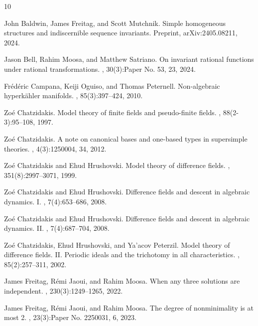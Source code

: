 \documentclass[\DocOpts]{amsart}
\theoremstyle{definition}
\newcommand{\<}{\langle}
\renewcommand{\>}{\rangle}
\begin{document}
\vfill\pagebreak

\begin{thebibliography}{10}

John Baldwin, James Freitag, and Scott Mutchnik.
\newblock Simple homogeneous structures and indiscernible sequence invariants.
\newblock Preprint, arXiv:2405.08211, 2024.

Jason Bell, Rahim Moosa, and Matthew Satriano.
\newblock On invariant rational functions under rational transformations.
, 30(3):Paper No. 53, 23, 2024.

Fr\'{e}d\'{e}ric Campana, Keiji Oguiso, and Thomas Peternell.
\newblock Non-algebraic hyperk\"{a}hler manifolds.
, 85(3):397--424, 2010.

Zo\'{e} Chatzidakis.
\newblock Model theory of finite fields and pseudo-finite fields.
, 88(2-3):95--108, 1997.

Zo\'{e} Chatzidakis.
\newblock A note on canonical bases and one-based types in supersimple
  theories.
, 4(3):1250004, 34, 2012.

Zo\'{e} Chatzidakis and Ehud Hrushovski.
\newblock Model theory of difference fields.
, 351(8):2997--3071, 1999.

Zo\'{e} Chatzidakis and Ehud Hrushovski.
\newblock Difference fields and descent in algebraic dynamics. {I}.
, 7(4):653--686, 2008.

Zo\'{e} Chatzidakis and Ehud Hrushovski.
\newblock Difference fields and descent in algebraic dynamics. {II}.
, 7(4):687--704, 2008.

Zo\'{e} Chatzidakis, Ehud Hrushovski, and Ya'acov Peterzil.
\newblock Model theory of difference fields. {II}. {P}eriodic ideals and the
  trichotomy in all characteristics.
, 85(2):257--311, 2002.

James Freitag, R\'{e}mi Jaoui, and Rahim Moosa.
\newblock When any three solutions are independent.
, 230(3):1249--1265, 2022.

James Freitag, R\'{e}mi Jaoui, and Rahim Moosa.
\newblock The degree of nonminimality is at most 2.
, 23(3):Paper No. 2250031, 6, 2023.


\end{thebibliography}
\end{document}

